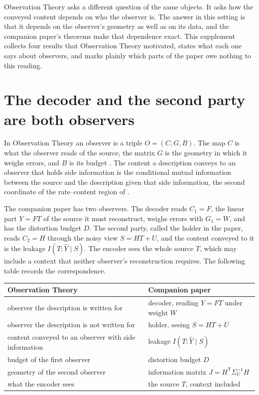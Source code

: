 \documentclass[11pt]{article}
\newcommand{\hY}{\hat Y}
\begin{document}
Observation Theory asks a different question of the same objects. It
asks how the conveyed content depends on who the observer is. The answer
in this setting is that it depends on the observer's geometry as well as
on its data, and the companion paper's theorems make that dependence
exact. This supplement collects four results that Observation Theory
motivated, states what each one says about observers, and marks plainly
which parts of the paper owe nothing to this reading.

\section{The decoder and the second party are both observers}
\label{sec:dictionary}

In Observation Theory an observer is a triple $O=(C,G,B)$. The map $C$
is what the observer reads of the source, the matrix $G$ is the geometry
in which it weighs errors, and $B$ is its budget \cite{obsrep}. The
content a description conveys to an observer that holds side information
is the conditional mutual information between the source and the
description given that side information, the second coordinate of the
rate--content region of \cite{obsrep}.

The companion paper has two observers. The decoder reads $C_1=F$, the
linear part $Y=FT$ of the source it must reconstruct, weighs errors with
$G_1=W$, and has the distortion budget $D$. The second party, called the
holder in the paper, reads $C_2=H$ through the noisy view $S=HT+U$, and
the content conveyed to it is the leakage $I(T;\hY\mid S)$. The encoder
sees the whole source $T$, which may include a context that neither
observer's reconstruction requires. The following table records the
correspondence.

\begin{center}
\begin{tabular}{>{\raggedright\arraybackslash}p{7.2cm}>{\raggedright\arraybackslash}p{7.2cm}}
\hline
Observation Theory & Companion paper \\
\hline
observer the description is written for & decoder, reading $Y=FT$ under weight $W$ \\
observer the description is not written for & holder, seeing $S=HT+U$ \\
content conveyed to an observer with side information & leakage $I(T;\hY\mid S)$ \\
budget of the first observer & distortion budget $D$ \\
geometry of the second observer & information matrix $J=H^{\mathsf T}\Sigma_U^{-1}H$ \\
what the encoder sees & the source $T$, context included \\
\hline
\end{tabular}
\end{center}
\end{document}
